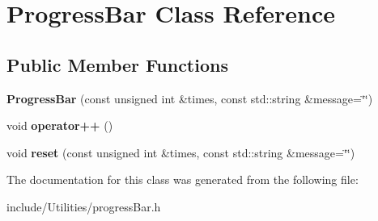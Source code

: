 \hypertarget{class_progress_bar}{
\section{ProgressBar Class Reference}
\label{class_progress_bar}
}
\subsection*{Public Member Functions}
\begin{DoxyCompactItemize}
\item 
\hypertarget{class_progress_bar_a62aec1386ff1548a508e1c5ffc727111}{
{\bfseries ProgressBar} (const unsigned int \&times, const std::string \&message=\char`\"{}\char`\"{})}
\label{class_progress_bar_a62aec1386ff1548a508e1c5ffc727111}

\item 
\hypertarget{class_progress_bar_adb5e9e9dcc610a2c430a147f5523e6f7}{
void {\bfseries operator++} ()}
\label{class_progress_bar_adb5e9e9dcc610a2c430a147f5523e6f7}

\item 
\hypertarget{class_progress_bar_a12117d62246c0805c5a46f32fb23be00}{
void {\bfseries reset} (const unsigned int \&times, const std::string \&message=\char`\"{}\char`\"{})}
\label{class_progress_bar_a12117d62246c0805c5a46f32fb23be00}

\end{DoxyCompactItemize}


The documentation for this class was generated from the following file:\begin{DoxyCompactItemize}
\item 
include/Utilities/progressBar.h\end{DoxyCompactItemize}

